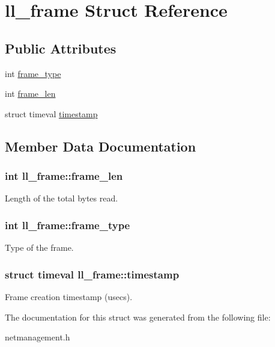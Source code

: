 \hypertarget{structll__frame}{\section{ll\-\_\-frame \-Struct \-Reference}
\label{structll__frame}
}
\subsection*{\-Public \-Attributes}
\begin{DoxyCompactItemize}
\item 
int \hyperlink{structll__frame_a008a1688bfb313361588e9bda627f194}{frame\-\_\-type}
\item 
int \hyperlink{structll__frame_a4236fda16dd9f5e8779525d8680ca87f}{frame\-\_\-len}
\item 
struct timeval \hyperlink{structll__frame_a0d3e1d078d8e8434f40d0754855bcf05}{timestamp}
\end{DoxyCompactItemize}


\subsection{\-Member \-Data \-Documentation}
\hypertarget{structll__frame_a4236fda16dd9f5e8779525d8680ca87f}{
\subsubsection[{frame\-\_\-len}]{\setlength{\rightskip}{0pt plus 5cm}int {\bf ll\-\_\-frame\-::frame\-\_\-len}}}\label{structll__frame_a4236fda16dd9f5e8779525d8680ca87f}
\-Length of the total bytes read. \hypertarget{structll__frame_a008a1688bfb313361588e9bda627f194}{
\subsubsection[{frame\-\_\-type}]{\setlength{\rightskip}{0pt plus 5cm}int {\bf ll\-\_\-frame\-::frame\-\_\-type}}}\label{structll__frame_a008a1688bfb313361588e9bda627f194}
\-Type of the frame. \hypertarget{structll__frame_a0d3e1d078d8e8434f40d0754855bcf05}{
\subsubsection[{timestamp}]{\setlength{\rightskip}{0pt plus 5cm}struct timeval {\bf ll\-\_\-frame\-::timestamp}}}\label{structll__frame_a0d3e1d078d8e8434f40d0754855bcf05}
\-Frame creation timestamp (usecs). 

\-The documentation for this struct was generated from the following file\-:\begin{DoxyCompactItemize}
\item 
netmanagement.\-h\end{DoxyCompactItemize}
